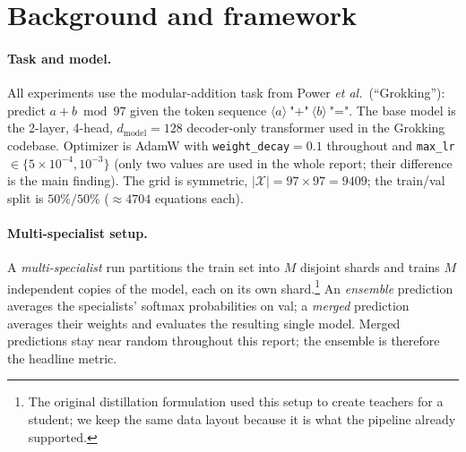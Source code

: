 \documentclass[11pt,a4paper]{article}
\begin{document}
\section{Background and framework}
\label{sec:background}

\paragraph{Task and model.}
All experiments use the modular-addition task from Power \textit{et
al.}\ (``Grokking''): predict $a + b \bmod 97$ given the token sequence
$\langle a\rangle\ \texttt{"+"}\ \langle b\rangle\ \texttt{"="}$. The
base model is the 2-layer, 4-head, $d_\text{model}{=}128$ decoder-only
transformer used in the Grokking codebase. Optimizer is AdamW with
\texttt{weight\_decay}$=0.1$ throughout and
\texttt{max\_lr}$\in\{5{\times}10^{-4}, 10^{-3}\}$ (only two values are
used in the whole report; their difference is the main finding). The
grid is symmetric, $|\mathcal{X}| = 97 \times 97 = 9409$; the train/val
split is $50\%/50\%$ ($\approx 4704$ equations each).

\paragraph{Multi-specialist setup.}
A \emph{multi-specialist} run partitions the train set into $M$ disjoint
shards and trains $M$ independent copies of the model, each on its own
shard.\footnote{The original distillation formulation used this setup
to create teachers for a student; we keep the same data layout because
it is what the pipeline already supported.} An \emph{ensemble}
prediction averages the specialists' softmax probabilities on val; a
\emph{merged} prediction averages their weights and evaluates the
resulting single model. Merged predictions stay near random throughout
this report; the ensemble is therefore the headline metric.
\end{document}
